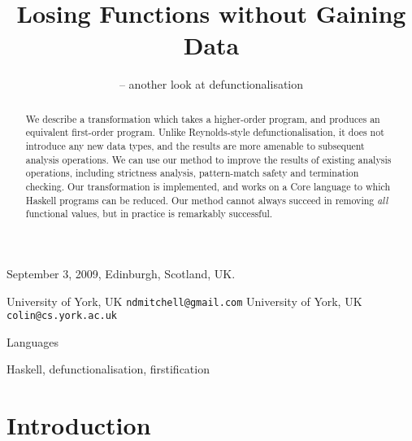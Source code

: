 \documentclass{sigplanconf}
\begin{document}
 {September 3, 2009, Edinburgh, Scotland, UK.}


\preprintfooter{}   %

\title{Losing Functions without Gaining Data}
\subtitle{ -- another look at defunctionalisation}

           {University of York, UK}
           {\verb"ndmitchell@gmail.com"}
           {University of York, UK}
           {\verb"colin@cs.york.ac.uk"}

\maketitle

\begin{abstract}
We describe a transformation which takes a higher-order program, and produces an equivalent first-order program. Unlike Reynolds-style defunctionalisation, it does not introduce any new data types, and the results are more amenable to subsequent analysis operations. We can use our method to improve the results of existing analysis operations, including strictness analysis, pattern-match safety and termination checking. Our transformation is implemented, and works on a Core language to which Haskell programs can be reduced. Our method cannot always succeed in removing \textit{all} functional values, but in practice is remarkably successful.
\end{abstract}


\terms
Languages

\keywords
Haskell, defunctionalisation, firstification

\section{Introduction}
\end{document}

